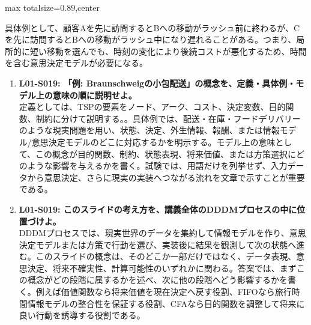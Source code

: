 \begin{minipage}[t]{0.58\textwidth}
\begin{adjustbox}{max totalsize={\textwidth}{0.89\textheight},center}
\begin{minipage}{\textwidth}
具体例として、顧客Aを先に訪問するとBへの移動がラッシュ前に終わるが、Cを先に訪問するとBへの移動がラッシュ中になり遅れることがある。つまり、局所的に短い移動を選んでも、時刻の変化により後続コストが悪化するため、時間を含む意思決定モデルが必要になる。\par{}\begin{enumerate}\item \textbf{L01-S019: 「例: Braunschweigの小包配送」の概念を、定義・具体例・モデル上の意味の順に説明せよ。}\\定義としては、TSPの要素をノード、アーク、コスト、決定変数、目的関数、制約に分けて説明する。。具体例では、配送・在庫・フードデリバリーのような現実問題を用い、状態、決定、外生情報、報酬、または情報モデル/意思決定モデルのどこに対応するかを明示する。モデル上の意味として、この概念が目的関数、制約、状態表現、将来価値、または方策選択にどのような影響を与えるかを書く。試験では、用語だけを列挙せず、入力データから意思決定、さらに現実の実装へつながる流れを文章で示すことが重要である。\item \textbf{L01-S019: このスライドの考え方を、講義全体のDDDMプロセスの中に位置づけよ。}\\DDDMプロセスでは、現実世界のデータを集約して情報モデルを作り、意思決定モデルまたは方策で行動を選び、実装後に結果を観測して次の状態へ進む。このスライドの概念は、そのどこか一部だけではなく、データ表現、意思決定、将来不確実性、計算可能性のいずれかに関わる。答案では、まずこの概念がどの段階に属するかを述べ、次に他の段階へどう影響するかを書く。例えば価値関数なら将来価値を現在決定へ戻す役割、FIFOなら旅行時間情報モデルの整合性を保証する役割、CFAなら目的関数を調整して将来に良い行動を誘導する役割である。\end{enumerate}
\end{minipage}
\end{adjustbox}
\end{minipage}


